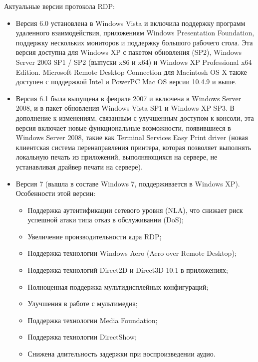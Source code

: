 Актуальные версии протокола RDP:
\begin{itemize}
    \item Версия 6.0 установлена в Windows Vista и включила поддержку программ
        удаленного взаимодействия, приложениям Windows Presentation Foundation,
        поддержку нескольких мониторов и поддержку большого рабочего стола. Эта версия
        доступна для Windows XP с пакетом обновления (SP2), Windows Server 2003 SP1 /
        SP2 (выпуски x86 и x64) и Windows XP Professional x64 Edition. Microsoft Remote
        Desktop Connection для Macintosh OS X также доступен с поддержкой Intel и
        PowerPC Mac OS версии 10.4.9 и выше.
        
    \item Версия 6.1 была выпущена в феврале 2007 и включена в Windows Server 2008, и в
        пакет обновления Windows Vista SP1 и Windows XP SP3.  В дополнение к изменениям,
        связанным с улучшенным доступом к консоли, эта версия включает новые
        функциональные возможности, появившиеся в Windows Server 2008, такие как
        Terminal Services Easy Print driver (новая клиентская система перенаправления
        принтера, которая позволяет выполнять локальную печать из приложений,
        выполняющихся на сервере, не устанавливая драйвер печати на сервере).
    \item Версия 7 (вышла в составе Windows 7, поддерживается в Windows XP). Особенности
        этой версии:
    \begin{itemize}
        \item Поддержка аутентификации сетевого уровня (NLA), что снижает риск успешной
            атаки типа отказ в обслуживании (DoS);
        \item Увеличение производительности ядра RDP;
        \item Поддержка технологии Windows Aero (Aero over Remote Desktop);
        \item Поддержка технологий Direct2D и Direct3D 10.1 в приложениях;
        \item Полноценная поддержка мультидисплейных конфигураций;
        \item Улучшения в работе с мультимедиа;
        \item Поддержка технологии Media Foundation;
        \item Поддержка технологии DirectShow;
        \item Снижена длительность задержки при воспроизведении аудио.
    \end{itemize}


\end{itemize}
